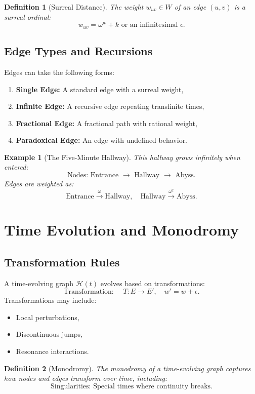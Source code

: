 \documentclass[12pt]{article}
\newcommand{\house}[0]{\mathcal{H}}
\newtheorem{definition}{Definition}[section]
\newtheorem{example}{Example}[section]
\begin{document}
\begin{definition}[Surreal Distance]
The weight $w_{uv} \in W$ of an edge $(u, v)$ is a surreal ordinal:
\[
w_{uv} = \omega^w + k \text{ or an infinitesimal } \epsilon.
\]
\end{definition}

\subsection{Edge Types and Recursions}
Edges can take the following forms:
\begin{enumerate}
    \item \textbf{Single Edge:} A standard edge with a surreal weight,
    \item \textbf{Infinite Edge:} A recursive edge repeating transfinite times,
    \item \textbf{Fractional Edge:} A fractional path with rational weight,
    \item \textbf{Paradoxical Edge:} An edge with undefined behavior.
\end{enumerate}

\begin{example}[The Five-Minute Hallway]
This hallway grows infinitely when entered:
\[
\text{Nodes: Entrance } \to \text{ Hallway } \to \text{ Abyss}.
\]
Edges are weighted as:
\[
\text{Entrance} \xrightarrow{\omega} \text{Hallway}, \quad \text{Hallway} \xrightarrow{\omega^2} \text{Abyss}.
\]
\end{example}

\section{Time Evolution and Monodromy}

\subsection{Transformation Rules}
A time-evolving graph $\house(t)$ evolves based on transformations:
\[
\text{Transformation: } \quad T : E \to E', \quad w' = w + \epsilon.
\]
Transformations may include:
\begin{itemize}
    \item Local perturbations,
    \item Discontinuous jumps,
    \item Resonance interactions.
\end{itemize}

\begin{definition}[Monodromy]
The \emph{monodromy} of a time-evolving graph captures how nodes and edges transform over time, including:
\[
\text{Singularities: Special times where continuity breaks}.
\]
\end{definition}
\end{document}
